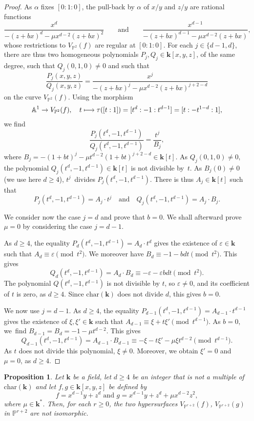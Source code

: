 \documentclass[11pt]{article}
\let\epsilon\varepsilon
\newcommand\mto{\mathchoice{\longmapsto}{\mapsto}{\mapsto}{\mapsto}}
\newcommand\qquand{\qquad\text{and}\qquad}
\newtheorem{proposition}[lemma]{Proposition}
\theoremstyle{definition}
\newcommand\A{{\mathbb A}}\let\AA\A
\renewcommand\k{{\mathbf k}}
\newcommand\p{{\mathbb P}}\let\PP\p
\newcommand{\kk}{\mathbf{k}}
\begin{document}
\begin{proof}
As $\alpha$ fixes $[0:1:0]$, the pull-back by $\alpha$ of $x/y$ and $z/y$ are rational functions
\[
\frac{x^d}{-(z+bx)^d-\mu x^{d-2}(z+bx)^2} \qquand
\frac{x^{d-1}}{-(z+bx)^{d-1}-\mu x^{d-2}(z+bx)},
\]
whose restrictions to $V_{\p^2}(f)$ are regular at $[0:1:0]$. For each $j\in \{d-1,d\}$, there are thus two homogeneous polynomials $P_j,Q_j\in\k[x,y,z]$, of the same degree, such that $Q_j(0,1,0)\neq 0$ and such that \[\frac{P_j(x,y,z)}{Q_j(x,y,z)}=\frac{x^{j}}{-(z+bx)^{j}-\mu x^{d-2}(z+bx)^{j+2-d}}\] on the curve $V_{\p^2}(f)$. Using the morphism
\[
\A^1\to V_{\p^2}(f), \quad t\mto \tau([t:1])=[t^d:-1:t^{d-1}]=[t:-t^{1-d}:1],
\]
we find
\[
\frac{P_j(t^d,-1,t^{d-1})}{Q_j(t^d,-1,t^{d-1})}=\frac{t^{j}}{B_j},
\]
where $B_j = -(1+bt)^{j}-\mu t^{d-2}(1+bt)^{j+2-d} \in \kk[t]$.
As $Q_j(0,1,0)\neq 0$, the polynomial $Q_j(t^d,-1,t^{d-1})\in \k[t]$ is not divisible by~$t$. As $B_j(0) \neq 0$
(we use here $d \geq 4$), $t^j$~divides $P_j(t^d,-1,t^{d-1})$. There is thus $A_j\in \k[t]$ such that
\[
P_j(t^d,-1,t^{d-1})=A_j\cdot t^j \quad \text{and} \quad Q_j(t^d,-1,t^{d-1})=A_j\cdot B_j.
\]

We consider now the case $j=d$ and prove that $b=0$. We shall afterward prove $\mu=0$ by considering the case $j=d-1$.

As $d\ge 4$, the equality $P_d(t^d,-1,t^{d-1})=A_d\cdot t^d$ gives the existence of $\epsilon\in \k$ such that $A_d\equiv \epsilon \pmod{t^{2}}$. We moreover have $B_d\equiv -1-bdt \pmod{t^2}$. This gives
\[Q_d(t^d,-1,t^{d-1})=A_d\cdot B_d\equiv -\epsilon -\epsilon bdt \pmod{t^2}.\]
The polynomial $Q(t^d,-1,t^{d-1})$ is not divisible by $t$, so $\epsilon\neq 0$, and its coefficient of $t$ is zero, as $d\ge 4$. Since $\mathrm{char}(\k)$ does not divide $d$, this gives $b=0$.

We now use $j=d-1$. As $d\ge 4$, the equality $P_{d-1}(t^d,-1,t^{d-1})=A_{d-1}\cdot t^{d-1}$ gives the existence of $\xi,\xi'\in \k$ such that $A_{d-1}\equiv \xi+t \xi' \pmod{t^{d-1}}$. As $b=0$, we~find $B_{d-1}=B_d=-1-\mu t^{d-2}$. This gives
\[Q_{d-1}(t^d,-1,t^{d-1})=A_{d-1}\cdot B_{d-1}\equiv -\xi-t \xi'-\mu\xi t^{d-2} \pmod{t^{d-1}}.\]
As $t$ does not divide this polynomial, $\xi\neq0$. Moreover, we obtain $\xi'=0$ and $\mu=0$, as $d\ge 4$.
\end{proof}

\begin{proposition}\label{Prop.IsoHypNN3}
Let $\kk$ be a field, let $d\ge 4$ be an integer that is not a multiple of $\mathrm{char}(\kk)$ and let $f,g\in\kk[x,y,z]$ be defined by \[f=x^{d-1}y+z^{d} \text{ and } g=x^{d-1}y+z^{d}+\mu x^{d-2}z^2,\] where $\mu\in \k^*$. Then, for each $r\ge 0$, the two hypersurfaces $V_{\p^{r+2}}(f)$, $V_{\p^{r+2}}(g)$ in $\p^{r+2}$ are not isomorphic.
\end{proposition}
\end{document}
